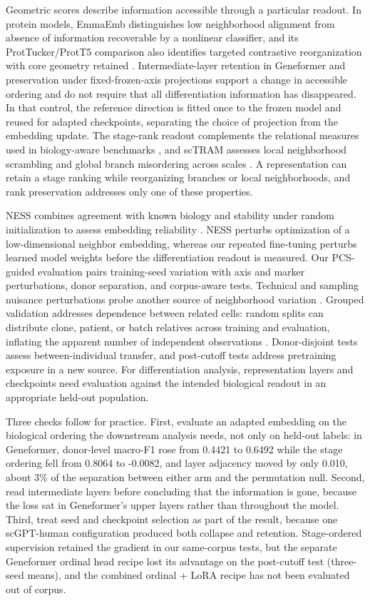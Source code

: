 \documentclass[12pt,letterpaper]{article}
\begin{document}
Geometric scores describe information accessible through a particular readout. In protein models, EmmaEmb distinguishes low neighborhood alignment from absence of information recoverable by a nonlinear classifier, and its ProtTucker/ProtT5 comparison also identifies targeted contrastive reorganization with core geometry retained \cite{emmaemb2026}. Intermediate-layer retention in Geneformer and preservation under fixed-frozen-axis projections support a change in accessible ordering and do not require that all differentiation information has disappeared. In that control, the reference direction is fitted once to the frozen model and reused for adapted checkpoints, separating the choice of projection from the embedding update. The stage-rank readout complements the relational measures used in biology-aware benchmarks \cite{wu2025,hou2026}, and scTRAM assesses local neighborhood scrambling and global branch misordering across scales \cite{sctram2025}. A representation can retain a stage ranking while reorganizing branches or local neighborhoods, and rank preservation addresses only one of these properties.

NESS combines agreement with known biology and stability under random initialization to assess embedding reliability \cite{ness2026}. NESS perturbs optimization of a low-dimensional neighbor embedding, whereas our repeated fine-tuning perturbs learned model weights before the differentiation readout is measured. Our PCS-guided evaluation pairs training-seed variation with axis and marker perturbations, donor separation, and corpus-aware tests. Technical and sampling nuisance perturbations probe another source of neighborhood variation \cite{nuisance2026}. Grouped validation addresses dependence between related cells: random splits can distribute clone, patient, or batch relatives across training and evaluation, inflating the apparent number of independent observations \cite{cellleak2026}. Donor-disjoint tests assess between-individual transfer, and post-cutoff tests address pretraining exposure in a new source. For differentiation analysis, representation layers and checkpoints need evaluation against the intended biological readout in an appropriate held-out population.

Three checks follow for practice. First, evaluate an adapted embedding on the biological ordering the downstream analysis needs, not only on held-out labels: in Geneformer, donor-level macro-F1 rose from 0.4421 to 0.6492 while the stage ordering fell from 0.8064 to -0.0082, and layer adjacency moved by only 0.010, about 3\% of the separation between either arm and the permutation null. Second, read intermediate layers before concluding that the information is gone, because the loss sat in Geneformer's upper layers rather than throughout the model. Third, treat seed and checkpoint selection as part of the result, because one scGPT-human configuration produced both collapse and retention. Stage-ordered supervision retained the gradient in our same-corpus tests, but the separate Geneformer ordinal head recipe lost its advantage on the post-cutoff test (three-seed means), and the combined ordinal + LoRA recipe has not been evaluated out of corpus.
\end{document}
